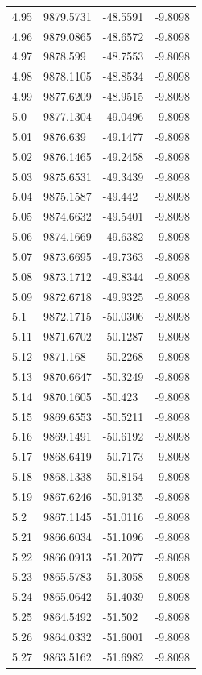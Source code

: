 \begin{table}[H]
\begin{tabular}{llll}
4.95 & 9879.5731 & -48.5591 & -9.8098 \\
4.96 & 9879.0865 & -48.6572 & -9.8098 \\
4.97 & 9878.599 & -48.7553 & -9.8098 \\
4.98 & 9878.1105 & -48.8534 & -9.8098 \\
4.99 & 9877.6209 & -48.9515 & -9.8098 \\
5.0 & 9877.1304 & -49.0496 & -9.8098 \\
5.01 & 9876.639 & -49.1477 & -9.8098 \\
5.02 & 9876.1465 & -49.2458 & -9.8098 \\
5.03 & 9875.6531 & -49.3439 & -9.8098 \\
5.04 & 9875.1587 & -49.442 & -9.8098 \\
5.05 & 9874.6632 & -49.5401 & -9.8098 \\
5.06 & 9874.1669 & -49.6382 & -9.8098 \\
5.07 & 9873.6695 & -49.7363 & -9.8098 \\
5.08 & 9873.1712 & -49.8344 & -9.8098 \\
5.09 & 9872.6718 & -49.9325 & -9.8098 \\
5.1 & 9872.1715 & -50.0306 & -9.8098 \\
5.11 & 9871.6702 & -50.1287 & -9.8098 \\
5.12 & 9871.168 & -50.2268 & -9.8098 \\
5.13 & 9870.6647 & -50.3249 & -9.8098 \\
5.14 & 9870.1605 & -50.423 & -9.8098 \\
5.15 & 9869.6553 & -50.5211 & -9.8098 \\
5.16 & 9869.1491 & -50.6192 & -9.8098 \\
5.17 & 9868.6419 & -50.7173 & -9.8098 \\
5.18 & 9868.1338 & -50.8154 & -9.8098 \\
5.19 & 9867.6246 & -50.9135 & -9.8098 \\
5.2 & 9867.1145 & -51.0116 & -9.8098 \\
5.21 & 9866.6034 & -51.1096 & -9.8098 \\
5.22 & 9866.0913 & -51.2077 & -9.8098 \\
5.23 & 9865.5783 & -51.3058 & -9.8098 \\
5.24 & 9865.0642 & -51.4039 & -9.8098 \\
5.25 & 9864.5492 & -51.502 & -9.8098 \\
5.26 & 9864.0332 & -51.6001 & -9.8098 \\
5.27 & 9863.5162 & -51.6982 & -9.8098 \\

\end{tabular}
\end{table}
